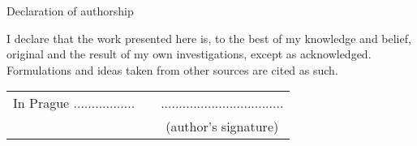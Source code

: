 \newcommand{\odsaditodzhora}{\hskip1pt\vfill}

\odsaditodzhora
\noindent Declaration of authorship


I declare that the work presented here is, to the best of my knowledge and belief,
original and the result of my own investigations, except as acknowledged.
Formulations and ideas taken from other sources are cited as such.

\begin{flushleft}
\begin{tabular}{cp{}c}
In Prague ................. 
&
&
..................................
\\
&&
(author's signature)
\end{tabular}

\end{flushleft}

